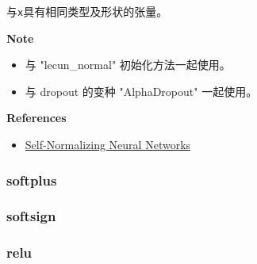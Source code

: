 与\texttt{x}具有相同类型及形状的张量。

\textbf{Note}

\begin{itemize}
\tightlist
\item
  与 "lecun\_normal" 初始化方法一起使用。
\item
  与 dropout 的变种 "AlphaDropout" 一起使用。
\end{itemize}

\textbf{References}

\begin{itemize}
\tightlist
\item
  \href{https://arxiv.org/abs/1706.02515}{Self-Normalizing Neural
  Networks}
\end{itemize}



\subsubsection{softplus}\label{softplus}

\begin{Shaded}
\begin{Highlighting}[]
\end{Highlighting}
\end{Shaded}



\subsubsection{softsign}\label{softsign}

\begin{Shaded}
\begin{Highlighting}[]
\end{Highlighting}
\end{Shaded}



\subsubsection{relu}\label{relu}

\begin{Shaded}
\begin{Highlighting}[]
\OperatorTok{=}\OperatorTok{=}\NormalTok{)}
\end{Highlighting}
\end{Shaded}



